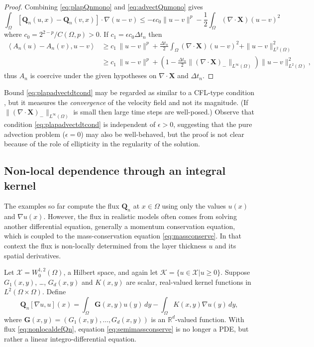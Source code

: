\documentclass[final,onefignum]{siamart190516}
\newcommand\bG{\mathbf{G}}
\newcommand\bQ{\mathbf{Q}}
\newcommand\bX{\mathbf{X}}
\newcommand{\Div}{\nabla\cdot}
\newcommand\eps{\epsilon}
\newcommand{\grad}{\nabla}
\newcommand{\ip}[2]{\ensuremath{\left<#1,#2\right>}}
\newcommand\RR{\mathbb{R}}
\begin{document}
\begin{proof} Combining \eqref{eq:plapQnmono} and \eqref{eq:advectQnmono} gives
\begin{equation*}
\int_\Omega \left[\bQ_n(u,x) - \bQ_n(v,x)\right] \cdot \grad (u - v) \le - \eps c_0 \|u-v\|^p - \frac{1}{2} \int_\Omega (\Div\bX) (u-v)^2
\end{equation*}
where $c_0=2^{2-p}/C(\Omega,p)>0$.  If $c_1 = \eps c_0 \Delta t_n$ then
\begin{align*}
\ip{A_n(u) - A_n(v)}{u-v} &\ge c_1\, \|u-v\|^p + \frac{\Delta t_n}{2} \int_\Omega (\Div\bX) (u-v)^2 + \|u-v\|_{L^2(\Omega)}^2 \\
   &\ge c_1\, \|u-v\|^p + \left(1 - \frac{\Delta t_n}{2} \|(\Div \bX)_-\|_{L^\infty(\Omega)}\right) \|u-v\|_{L^2(\Omega)}^2,
\end{align*}
thus $A_n$ is coercive under the given hypotheses on $\Div \bX$ and $\Delta t_n$. \end{proof}

Bound \eqref{eq:plapadvectdtcond} may be regarded as similar to a CFL-type condition \cite{LeVeque2002}, but it measures the \emph{convergence} of the velocity field and not its magnitude.  (If $\|(\Div \bX)_-\|_{L^\infty(\Omega)}$ is small then large time steps are well-posed.) Observe that condition \eqref{eq:plapadvectdtcond} is independent of $\eps>0$, suggesting that the pure advection problem ($\eps = 0$) may also be well-behaved, but the proof is not clear because of the role of ellipticity in the regularity of the solution.

\subsection{Non-local dependence through an integral kernel} \label{subsec:nonlocal}   The examples so far compute the flux $\bQ_n$ at $x\in\Omega$ using only the values $u(x)$ and $\grad u(x)$.  However, the flux in realistic models often comes from solving another differential equation, generally a momentum conservation equation, which is coupled to the mass-conservation equation \eqref{eq:massconserve}.  In that context the flux is non-locally determined from the layer thickness $u$ and its spatial derivatives.

Let $\mathcal{X} = W_0^{1,2}(\Omega)$, a Hilbert space, and again let $\mathcal{K}=\{u\in\mathcal{X}|u\ge 0\}$.  Suppose $G_1(x,y)$, \dots, $G_d(x,y)$ and $K(x,y)$ are scalar, real-valued kernel functions in $L^2(\Omega\times \Omega)$.  Define
\begin{equation}
\bQ_n[\grad u,u](x) = \int_\Omega \bG(x,y) u(y)\,dy - \int_\Omega K(x,y) \grad u(y)\,dy, \label{eq:nonlocaldefQn}
\end{equation}
where $\bG(x,y) = (G_1(x,y), \dots, G_d(x,y))$ is an $\RR^d$-valued function.  With flux \eqref{eq:nonlocaldefQn}, equation \eqref{eq:semimassconserve} is no longer a PDE, but rather a linear integro-differential equation.
\end{document}
